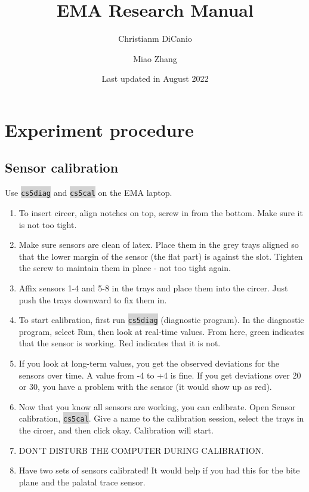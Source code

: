 \documentclass[12pt]{article}
\begin{document}
\title{EMA Research Manual}
\author[1]{Christianm DiCanio}
\author[2]{Miao Zhang}
\date{Last updated in August 2022}

\maketitle

\tableofcontents

\section{Experiment procedure}
\subsection{Sensor calibration}
	Use \colorbox{lightgray}{\texttt{cs5diag}} and \colorbox{lightgray}{\texttt{cs5cal}} on the EMA laptop.
	
	\begin{enumerate}
	    \item To insert circer, align notches on top, screw in from the bottom. Make sure it is not too tight.
	    
	    \item Make sure sensors are clean of latex. Place them in the grey trays aligned so that the lower margin of the sensor (the flat part) is against the slot. Tighten the screw to maintain them in place - not too tight again.
	    
	    \item Affix sensors 1-4 and 5-8 in the trays and place them into the circer. Just push the trays downward to fix them in.
	    
	    \item To start calibration, first run \colorbox{lightgray}{\texttt{cs5diag}} (diagnostic program). In the diagnostic program, select Run, then look at real-time values. From here, green indicates that the sensor is working. Red indicates that it is not.
	    
	    \item If you look at long-term values, you get the observed deviations for the sensors over time. A value from -4 to +4 is fine. If you get deviations over 20 or 30, you have a problem with the sensor (it would show up as red).
	    
	    \item Now that you know all sensors are working, you can calibrate. Open Sensor calibration, \colorbox{lightgray}{\texttt{cs5cal}}. Give a name to the calibration session, select the trays in the circer, and then click okay. Calibration will start.
	    
	    \item DON'T DISTURB THE COMPUTER DURING CALIBRATION.
	    
	    \item Have two sets of sensors calibrated! It would help if you had this for the bite plane and the palatal trace sensor.
	    
	\end{enumerate}
\end{document}
